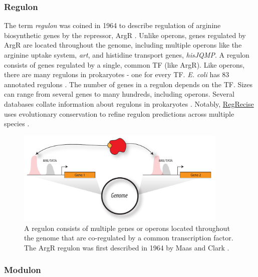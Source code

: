 \subsubsection{Regulon}

The term \textit{regulon} was coined in 1964 to describe regulation of arginine biosynthetic genes by the repressor, ArgR \cite{maas_studies_1964}. Unlike operons, genes regulated by ArgR are located throughout the genome, including multiple operons like the arginine uptake system, \textit{art}, and histidine transport genes, \textit{hisJQMP}. A regulon consists of genes regulated by a single, common TF (like ArgR). Like operons, there are many regulons in prokaryotes - one for every TF. \textit{E. coli} has 83 annotated regulons \cite{novichkov_regprecise_2012}. The number of genes in a regulon depends on the TF. Sizes can range from several genes to many hundreds, including operons. Several databases collate information about regulons in prokaryotes \cite{alm_microbesonline_2005,novichkov_regpredict:_2010,novichkov_regprecise_2012}. Notably, \href{http://regprecise.lbl.gov/RegPrecise/}{RegRecise} uses evolutionary conservation to refine regulon predictions across multiple species \cite{novichkov_regprecise_2012}.

\begin{figure}[h!]
    \centering
    \includegraphics[width=0.9\textwidth]{figures/regulon}
 	\caption[Regulon: multiple gene regulated by a common transcription factor]{
 	A regulon consists of multiple genes or operons located throughout the genome that are co-regulated by a common transcription factor. The ArgR regulon was first described in 1964 by Maas and Clark \cite{maas_studies_1964}.
}
    \label{fig:chap1:regulon}
\end{figure}

\subsubsection{Modulon}

